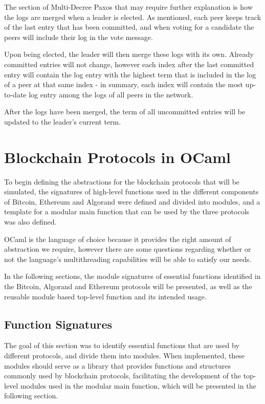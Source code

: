 \vspace{0.2cm}

The section of Multi-Decree Paxos that may require further explanation is how the logs are merged when a leader is elected. As mentioned, each peer keeps track of the last entry that has been committed, and when voting for a candidate the peers will include their log in the vote message.

Upon being elected, the leader will then merge these logs with its own. Already committed entries will not change, however each index after the last committed entry will contain the log entry with the highest term that is included in the log of a peer at that same index - in summary, each index will contain the most up-to-date log entry among the logs of all peers in the network.

After the logs have been merged, the term of all uncommitted entries will be updated to the leader's current term.





\section{Blockchain Protocols in OCaml}

To begin defining the abstractions for the blockchain protocols that will be simulated, the signatures of high-level functions used in the different components of Bitcoin, Ethereum and Algorand were defined and divided into modules, and a template for a modular main function that can be used by the three protocols was also defined.

OCaml is the language of choice because it provides the right amount of abstraction we require, however there are some questions regarding whether or not the language's multithreading capabilities will be able to satisfy our needs.

In the following sections, the module signatures of essential functions identified in the Bitcoin, Algorand and Ethereum protocols will be presented, as well as the reusable module based top-level function and its intended usage.

\subsection{Function Signatures}

The goal of this section was to identify essential functions that are used by different protocols, and divide them into modules. When implemented, these modules should serve as a library that provides functions and structures commonly used by blockchain protocols, facilitating the development of the top-level modules used in the modular main function, which will be presented in the following section.


